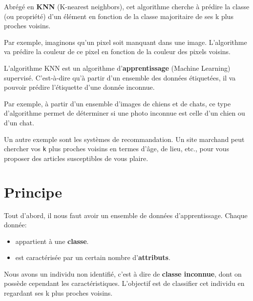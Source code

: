 \def\level{Première}  %
\def\course{NSI}
\def\chaptername{Algorithme k plus proches voisins (knn)} %
\def\docname{AP10}        %

\pagestyle{cours_FP}
\makeheader{} %

\begin{definition}{}
Abrégé en \textbf{KNN} (K-nearest neighbors), cet algorithme cherche à prédire la classe (ou propriété) d'un élément en fonction de la classe majoritaire de ses k plus proches voisins.
\end{definition}



Par exemple, imaginons qu'un pixel soit manquant dans une image. L'algorithme va prédire la couleur de ce pixel en fonction de la couleur des pixels voisins.



L'algorithme KNN est un algorithme d'\textbf{apprentissage} (Machine Learning) supervisé. C'est-à-dire qu'à partir d'un ensemble des données étiquetées, il va pouvoir prédire l'étiquette d'une donnée inconnue.

Par exemple, à partir d'un ensemble d'images de chiens et de chats, ce type d'algorithme permet de déterminer si une photo inconnue est celle d'un chien ou d'un chat.

Un autre exemple sont les systèmes de recommandation. Un site marchand peut chercher vos \verb+k+ plus proches voisins en termes d'âge, de lieu, etc., pour vous proposer des articles susceptibles de vous plaire.


\section{Principe}

Tout d'abord, il nous faut avoir un ensemble de données d'apprentissage. Chaque donnée:

\begin{itemize}
	\item appartient à une \textbf{classe}.
	\item est caractérisée par un certain nombre d'\textbf{attributs}.
\end{itemize}

Nous avons un individu non identifié, c'est à dire de \textbf{classe inconnue}, dont on possède cependant les caractéristiques. L'objectif est de classifier cet individu en regardant ses k plus proches voisins.


